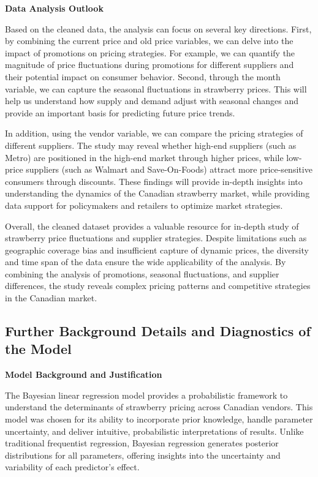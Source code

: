 \documentclass[
  letterpaper,
  DIV=11,
  numbers=noendperiod]{scrartcl}
\begin{document}
\textbf{Data Analysis Outlook}

Based on the cleaned data, the analysis can focus on several key
directions. First, by combining the current price and old price
variables, we can delve into the impact of promotions on pricing
strategies. For example, we can quantify the magnitude of price
fluctuations during promotions for different suppliers and their
potential impact on consumer behavior. Second, through the month
variable, we can capture the seasonal fluctuations in strawberry prices.
This will help us understand how supply and demand adjust with seasonal
changes and provide an important basis for predicting future price
trends.

In addition, using the vendor variable, we can compare the pricing
strategies of different suppliers. The study may reveal whether high-end
suppliers (such as Metro) are positioned in the high-end market through
higher prices, while low-price suppliers (such as Walmart and
Save-On-Foods) attract more price-sensitive consumers through discounts.
These findings will provide in-depth insights into understanding the
dynamics of the Canadian strawberry market, while providing data support
for policymakers and retailers to optimize market strategies.

Overall, the cleaned dataset provides a valuable resource for in-depth
study of strawberry price fluctuations and supplier strategies. Despite
limitations such as geographic coverage bias and insufficient capture of
dynamic prices, the diversity and time span of the data ensure the wide
applicability of the analysis. By combining the analysis of promotions,
seasonal fluctuations, and supplier differences, the study reveals
complex pricing patterns and competitive strategies in the Canadian
market.

\subsection{Further Background Details and Diagnostics of the
Model}\label{sec-model-details}

\textbf{Model Background and Justification}

The Bayesian linear regression model provides a probabilistic framework
to understand the determinants of strawberry pricing across Canadian
vendors. This model was chosen for its ability to incorporate prior
knowledge, handle parameter uncertainty, and deliver intuitive,
probabilistic interpretations of results. Unlike traditional frequentist
regression, Bayesian regression generates posterior distributions for
all parameters, offering insights into the uncertainty and variability
of each predictor's effect.
\end{document}
